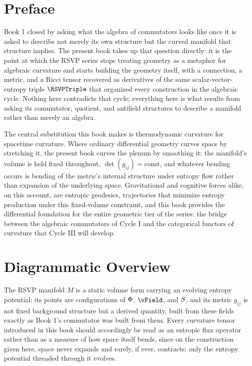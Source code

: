 \chapter*{Preface}

Book 1 closed by asking what the algebra of commutators looks like once it is asked to describe not merely its own structure but the curved manifold that structure implies. The present book takes up that question directly: it is the point at which the RSVP series stops treating geometry as a metaphor for algebraic curvature and starts building the geometry itself, with a connection, a metric, and a Ricci tensor recovered as derivatives of the same scalar-vector-entropy triple $\RSVPTriple$ that organized every construction in the algebraic cycle. Nothing here contradicts that cycle; everything here is what results from asking its commutator, quotient, and antifield structures to describe a manifold rather than merely an algebra.

The central substitution this book makes is thermodynamic curvature for spacetime curvature. Where ordinary differential geometry curves space by stretching it, the present book curves the plenum by smoothing it: the manifold's volume is held fixed throughout, $\det(g_{ij}) = \text{const}$, and whatever bending occurs is bending of the metric's internal structure under entropy flow rather than expansion of the underlying space. Gravitational and cognitive forces alike, on this account, are entropic geodesics, trajectories that minimize entropy production under this fixed-volume constraint, and this book provides the differential foundation for the entire geometric tier of the series: the bridge between the algebraic commutators of Cycle I and the categorical functors of curvature that Cycle III will develop.

\chapter*{Diagrammatic Overview}

The RSVP manifold $M$ is a static volume form carrying an evolving entropy potential: its points are configurations of $\Phi$, $\vField$, and $S$, and its metric $g_{ij}$ is not fixed background structure but a derived quantity, built from these fields exactly as Book 1's commutator was built from them. Every curvature tensor introduced in this book should accordingly be read as an entropic flux operator rather than as a measure of how space itself bends, since on the construction given here, space never expands and rarely, if ever, contracts; only the entropy potential threaded through it evolves.

